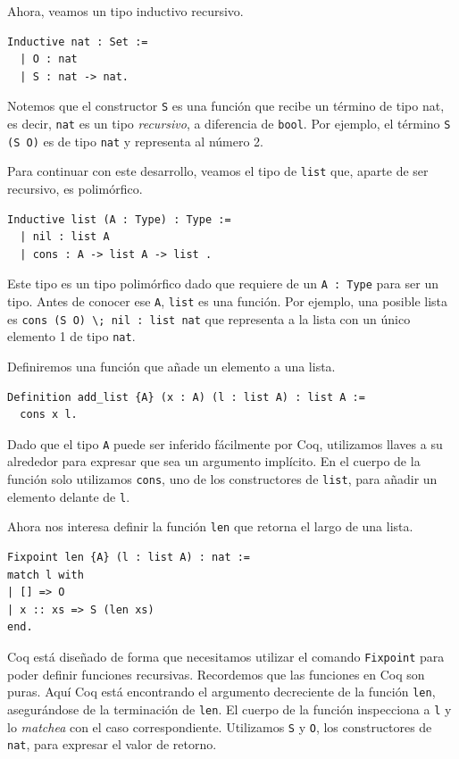 Ahora, veamos un tipo inductivo recursivo.

\begin{lstlisting}
Inductive nat : Set :=
  | O : nat
  | S : nat -> nat.
\end{lstlisting}

Notemos que el constructor \lstinline{S} es una función que recibe un término de tipo {nat}, es decir, \lstinline{nat} es un tipo \emph{recursivo}, a diferencia de \lstinline{bool}. Por ejemplo, el término \lstinline{S (S O)} es de tipo \lstinline{nat} y representa al número 2.

Para continuar con este desarrollo, veamos el tipo de \lstinline{list} que, aparte de ser recursivo, es polimórfico.

\begin{lstlisting}
Inductive list (A : Type) : Type :=
  | nil : list A
  | cons : A -> list A -> list .
\end{lstlisting}

Este tipo es un tipo polimórfico dado que requiere de un \lstinline{A : Type} para ser un tipo. Antes de conocer ese \lstinline{A}, \lstinline{list} es una función. Por ejemplo, una posible lista es \lstinline{cons (S O) \; nil : list nat} que representa a la lista con un único elemento 1 de tipo \lstinline{nat}.

Definiremos una función que añade un elemento a una lista.

\begin{lstlisting}
Definition add_list {A} (x : A) (l : list A) : list A :=
  cons x l.
\end{lstlisting}

Dado que el tipo \lstinline{A} puede ser inferido fácilmente por Coq, utilizamos llaves a su alrededor para expresar que sea un argumento implícito. En el cuerpo de la función solo utilizamos \lstinline{cons}, uno de los constructores de \lstinline{list}, para añadir un elemento delante de \lstinline{l}.

Ahora nos interesa definir la función \lstinline{len} que retorna el largo de una lista.

\begin{lstlisting}
Fixpoint len {A} (l : list A) : nat :=
match l with
| [] => O
| x :: xs => S (len xs)
end.
\end{lstlisting}

Coq está diseñado de forma que necesitamos utilizar el comando \lstinline{Fixpoint} para poder definir funciones recursivas. Recordemos que las funciones en Coq son puras. Aquí Coq está encontrando el argumento decreciente de la función \lstinline{len}, asegurándose de la terminación de \lstinline{len}.
El cuerpo de la función inspecciona a \lstinline{l} y lo \textit{matchea} con el caso correspondiente. Utilizamos \lstinline{S} y \lstinline{O}, los constructores de \lstinline{nat}, para expresar el valor de retorno.

